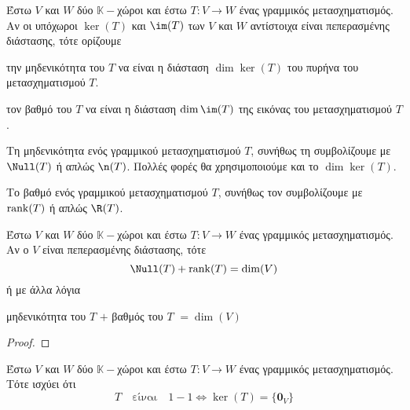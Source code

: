 \begin{dfn}
  Έστω $V$ και $W$ δύο $ \mathbb{K} - $χώροι και έστω $ T \colon V \to W $ ένας 
  γραμμικός μετασχηματισμός. Αν οι υπόχωροι $ \ker(T) $ και $ \im(T) $ των $V$ και $W$ 
  αντίστοιχα είναι πεπερασμένης διάστασης, τότε ορίζουμε 
  \begin{myitemize}
    \item την \textcolor{Col1}{μηδενικότητα} του $T$ να είναι η διάσταση 
      $ \dim \ker(T) $ του πυρήνα του μετασχηματισμού $T$.
    \item τον \textcolor{Col1}{βαθμό} του $T$ να είναι η διάσταση $ \dim \im(T) $ της 
     εικόνας του μετασχηματισμού $ T $.
  \end{myitemize}
\end{dfn}

\begin{rem}
\item {}
  \begin{myitemize}
    \item Τη μηδενικότητα ενός γραμμικού μετασχηματισμού $T$, συνήθως τη συμβολίζουμε με 
      $ \Null(T) $ ή απλώς $ \n(T) $. Πολλές φορές θα χρησιμοποιούμε και το 
      $ \dim \ker(T) $.
    \item Το βαθμό ενός γραμμικού μετασχηματισμού $T$, συνήθως τον συμβολίζουμε με 
      $ \rank(T) $ ή απλώς $ \R(T) $.
  \end{myitemize}
\end{rem}

\begin{thm}
  Έστω $ V $ και $W$ δύο $ \mathbb{K}- $χώροι και έστω $ T \colon V \to W $ ένας 
  γραμμικός μετασχηματισμός. Αν ο $V$ είναι πεπερασμένης διάστασης, τότε 
  \[
    \Null(T) + \rank(T) = \dim (V) 
  \]
  ή με άλλα λόγια
  \begin{center}
    μηδενικότητα του $T$ $ + $ βαθμός του $T$ $ = \dim (V) $ 
  \end{center}
\end{thm}

\begin{proof}
\end{proof}

\begin{thm}
  Έστω $ V $ και $W$ δύο $ \mathbb{K}- $χώροι και έστω $ T \colon V \to W $ ένας 
  γραμμικός μετασχηματισμός. Τότε ισχύει ότι 
  \[
    T \quad \text{είναι} \quad 1-1 \Leftrightarrow \ker(T) = \{ \mathbf{0}_{V} \} 
  \] 
\end{thm}

